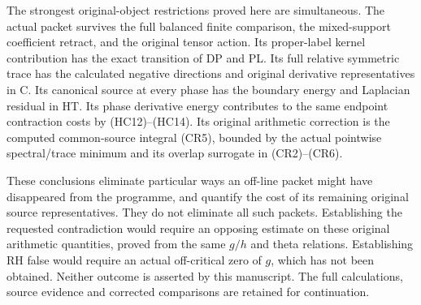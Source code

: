 The strongest original-object restrictions proved here are simultaneous.
The actual packet survives the full balanced finite comparison, the
mixed-support coefficient retract, and the original tensor action.
Its proper-label kernel contribution has the exact transition of DP
and PL. Its full relative symmetric trace has the calculated negative
directions and original derivative representatives in C. Its canonical
source at every phase has the boundary energy and Laplacian residual
in HT. Its phase derivative energy contributes to the same endpoint
contraction costs by (HC12)--(HC14). Its original arithmetic correction
is the computed common-source integral (CR5), bounded by the actual
pointwise spectral/trace minimum and its overlap surrogate in
(CR2)--(CR6).

These conclusions eliminate particular ways an off-line packet might
have disappeared from the programme, and quantify the cost of its
remaining original source representatives. They do not eliminate all
such packets. Establishing the requested contradiction would require
an opposing estimate on these original arithmetic quantities, proved
from the same $g/h$ and theta relations. Establishing RH false would
require an actual off-critical zero of $g$, which has not been obtained.
Neither outcome is asserted by this manuscript. The full calculations,
source evidence and corrected comparisons are retained for continuation.
